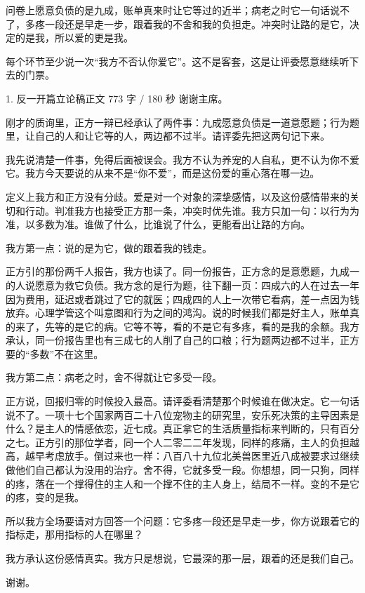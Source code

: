 \documentclass[script,con]{debate}
\begin{document}
\debatetitle
\begin{thesisbox}[全场一句话立论]问卷上愿意负债的是九成，账单真来时让它等过的近半；病老之时它一句话说不了，多疼一段还是早走一步，跟着我的不舍和我的负担走。冲突时让路的是它，决定的是我，所以爱的更是我。\end{thesisbox}
\begin{thesisbox}[全队第一纪律]每个环节至少说一次“我方不否认你爱它”。这不是客套，这是让评委愿意继续听下去的门票。\end{thesisbox}

\begin{speech}{1. 反一开篇立论稿}{正文 773 字 / 180 秒}
谢谢主席。

刚才的质询里，正方一辩已经承认了两件事：九成愿意负债是一道意愿题；行为题里，让自己的人和让它等的人，两边都不过半。请评委先把这两句记下来。

我先说清楚一件事，免得后面被误会。我方不认为养宠的人自私，更不认为你不爱它。我方今天要说的从来不是“你不爱”，而是这份爱的重心落在哪一边。

定义上我方和正方没有分歧。爱是对一个对象的深挚感情，以及这份感情带来的关切和行动。判准我方也接受正方那一条，冲突时优先谁。我方只加一句：以行为为准，以多数为准。谁做了什么，比谁说了什么，更能看出让路的方向。

我方第一点：说的是为它，做的跟着我的钱走。

正方引的那份两千人报告，我方也读了。同一份报告，正方念的是意愿题，九成一的人说愿意为救它负债。我方念的是行为题，往下翻一页：四成六的人在过去一年因为费用，延迟或者跳过了它的就医；四成四的人上一次带它看病，差一点因为钱放弃。心理学管这个叫意图和行为之间的鸿沟。说的时候我们都是好主人，账单真的来了，先等的是它的病。它等不等，看的不是它有多疼，看的是我的余额。我方承认，同一份报告里也有三成七的人削了自己的口粮；行为题两边都不过半，正方要的“多数”不在这里。

我方第二点：病老之时，舍不得就让它多受一段。

正方说，回报归零的时候投入最高。请评委看清楚那个时候谁在做决定。它一句话说不了。一项十七个国家两百二十八位宠物主的研究里，安乐死决策的主导因素是什么？是主人的情感依恋，近七成。真正拿它的生活质量指标来判断的，只有百分之七。正方引的那位学者，同一个人二零二二年发现，同样的疼痛，主人的负担越高，越早考虑放手。倒过来也一样：八百八十九位北美兽医里近八成被要求过继续做他们自己都认为没用的治疗。舍不得，它就多受一段。你想想，同一只狗，同样的疼，落在一个撑得住的主人和一个撑不住的主人身上，结局不一样。变的不是它的疼，变的是我。

所以我方全场要请对方回答一个问题：它多疼一段还是早走一步，你方说跟着它的指标走，那用指标的人在哪里？

我方承认这份感情真实。我方只是想说，它最深的那一层，跟着的还是我们自己。

谢谢。
\end{speech}
\begin{contingency}
\end{contingency}
\end{document}
